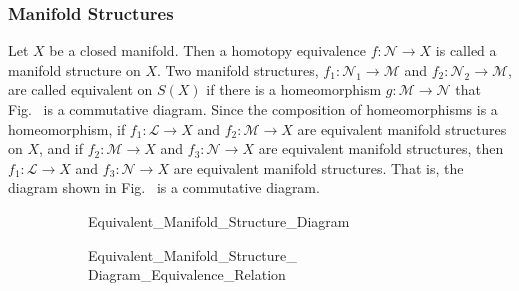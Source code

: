 \documentclass[crop=false,class=article,oneside]{standalone}
\begin{document}
        \subsubsection{Manifold Structures}
            Let $X$ be a closed manifold. Then a homotopy
            equivalence $f:\mathcal{N}\rightarrow{X}$ is called a
            manifold structure on $X$. Two manifold structures,
            $f_{1}:\mathcal{N}_{1}\rightarrow{\mathcal{M}}$ and
            $f_{2}:\mathcal{N}_{2}\rightarrow{\mathcal{M}}$, are called
            equivalent on $S(X)$ if there is a homeomorphism
            $g:\mathcal{M}\rightarrow\mathcal{N}$ that
            Fig.~
            is a commutative diagram. Since the composition of homeomorphisms
            is a homeomorphism, if $f_{1}:\mathcal{L}\rightarrow{X}$ and
            $f_{2}:\mathcal{M}\rightarrow{X}$ are equivalent manifold structures
            on $X$, and if $f_{2}:\mathcal{M}\rightarrow{X}$
            and $f_{3}:\mathcal{N}\rightarrow{X}$ are equivalent
            manifold structures, then $f_{1}:\mathcal{L}\rightarrow{X}$
            and $f_{3}:\mathcal{N}\rightarrow{X}$ are equivalent manifold
            structures. That is, the diagram shown in
            Fig.~
            is a commutative diagram.
            \begin{figure}[H]
                \captionsetup{type=figure}
                \begin{subfigure}[b]{0.49\textwidth}
                    \centering
                    \captionsetup{type=figure}
                    
                              {Equivalent_Manifold_Structure_Diagram}
                    \label{fig:Surgery_Theory_Equivalent_Manifold_Structure_Diagram}
                \end{subfigure}
                \begin{subfigure}[b]{0.49\textwidth}
                    \centering
                    \captionsetup{type=figure}
                    
                              {Equivalent_Manifold_Structure_%
                               Diagram_Equivalence_Relation}
                    \label{fig:Surgery_Theory_Equivalent_%
                           Manifold_Structure_Diagram_Equivalence_Relation}
                \end{subfigure}
                \label{Commutative Diagrams for Manifold Structures.}
                \label{fig:Commutative_Diagrams_for_Manifold_Structures}
            \end{figure}
\end{document}
